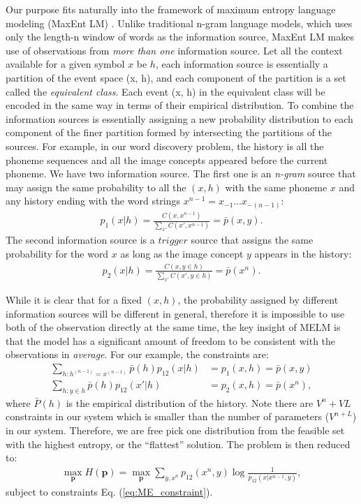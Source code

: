 \documentclass[a4paper]{article}
\begin{document}
Our purpose fits naturally into the framework of maximum entropy language modeling (MaxEnt LM) \cite{Lau93}. Unlike traditional n-gram language models, which uses only the length-n window of words as the information source, MaxEnt LM makes use of observations from \textit{more than one} information source. Let all the context available for a given symbol $x$ be $h$, each information source is essentially a partition of the event space (x, h), and each component of the partition is a set called the \textit{equivalent class}. Each event (x, h) in the equivalent class will be encoded in the same way in terms of their empirical distribution. To combine the information sources is essentially assigning a new probability distribution to each component of the finer partition formed by intersecting the partitions of the sources. For example, in our word discovery problem, the history is all the phoneme sequences and all the image concepts appeared before the current phoneme. We have two information source. The first one is an \textit{n-gram} source that may assign the same probability to all the $(x, h)$ with the same phoneme $x$ and any history ending with the word strings $x^{n-1} = x_{-1}\ldots x_{-(n-1)}$:
\begin{align}\label{eq:ME_bigram_source}
    p_1(x|h) = \frac{C(x, x^{n-1})}{\sum_{x'}C(x', x^{n-1})} = \bar{p}(x, y).
\end{align}
The second information source is a $\textit{trigger}$ source \cite{Lau93} that assigns the same probability for the word $x$ as long as the image concept $y$ appears in the history:
\begin{align}\label{eq:ME_trigger_source}
    p_2(x|h) = \frac{C(x, y\in h)}{\sum_{x'}C(x', y\in h)} = \bar{p}(x^n).
\end{align}

While it is clear that for a fixed $(x, h)$, the probability assigned by different information sources will be different in general,
therefore it is impossible to use both of the observation directly at the same time, the key insight of MELM is that the model has a significant amount of freedom to be consistent with the observations in \textit{average}. For our example, the constraints are:
\begin{align}\label{eq:ME_constraint}
    \sum_{h:h^{(n-1)} = x^{(n-1)}}\bar{p}(h)p_{12}(x|h) &= p_{1}(x, h) = \bar{p}(x, y)\\
    \sum_{h:y\in h}\bar{p}(h)p_{12}(x'|h) &= p_{2}(x, h) = \bar{p}(x^n),
\end{align}
where $\bar{P}(h)$ is the empirical distribution of the history. Note there are $V^{n}+VL$ constraints in our system which is smaller than the number of parameters ($V^{n+L}$) in our system. Therefore, we are free pick one distribution from the feasible set with the highest entropy, or the ``flattest'' solution. The problem is then reduced to:
\begin{align}\label{eq:ME_formulation}
    \max_{\mathbf{p}} H(\mathbf{p}) = \max_{\mathbf{p}} \sum_{y, x^n} p_{12}(x^n, y) \log \frac{1}{p_{12}(x|x^{n-1}, y)},
\end{align}
subject to constraints Eq. (\ref{eq:ME_constraint}).
\end{document}
